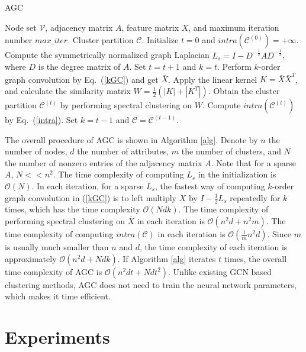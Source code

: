 \documentclass{article}
\begin{document}
\begin{algorithm}[t]\footnotesize
\caption{AGC}
\label{alg}
\begin{algorithmic}[1]
\REQUIRE
Node set $\mathcal{V}$, adjacency matrix $A$, feature matrix $X$, and maximum iteration number $max\_iter$.
\ENSURE
Cluster partition $\mathcal{C}$.
\STATE Initialize $t=0$ and $intra(\mathcal{C}^{(0)})=+\infty$. Compute the symmetrically normalized graph Laplacian $L_s=I-D^{-\frac12}AD^{-\frac12}$, where $D$ is the degree matrix of $A$.
\REPEAT
\STATE Set $t=t+1$ and $k=t$.
\STATE Perform $k$-order graph convolution by Eq.~(\ref{kGC}) and get $\bar{X}$.
\STATE Apply the linear kernel $K=\bar{X}\bar{X}^T$, and calculate the similarity matrix $W=\frac12(|K|+|K^T|)$.
\STATE Obtain the cluster partition $\mathcal{C}^{(t)}$ by performing spectral clustering on $W$.
\STATE Compute $intra(\mathcal{C}^{(t)})$ by Eq.~(\ref{intra}).
\STATE Set $k=t-1$ and $\mathcal{C}=\mathcal{C}^{(t-1)}$.
\end{algorithmic}
\end{algorithm}

The overall procedure of AGC is shown in Algorithm \ref{alg}.
Denote by $n$ the number of nodes, $d$ the number of attributes, $m$ the number of clusters, and $N$ the number of nonzero entries of the adjacency matrix $A$. Note that for a sparse $A$, $N<<n^2$. The time complexity of computing $L_s$ in the initialization is $\mathcal{O}(N)$. In each iteration, for a sparse $L_s$, the fastest way of computing $k$-order graph convolution in (\ref{kGC}) is to left multiply $X$ by $I-\frac12 L_s$ repeatedly for $k$ times, which has the time complexity $\mathcal{O}(Ndk)$. The time complexity of performing spectral clustering on $\bar{X}$ in each iteration is $\mathcal{O}(n^2d+n^2m)$. The time complexity of computing $intra(\mathcal{C})$ in each iteration is $\mathcal{O}(\frac1m n^2d)$. Since $m$ is usually much smaller than $n$ and $d$, the time complexity of each iteration is approximately  $\mathcal{O}(n^2d+Ndk)$. If Algorithm \ref{alg} iterates $t$ times, the overall time complexity of AGC is $\mathcal{O}(n^2dt+Ndt^2)$. Unlike existing GCN based clustering methods, AGC does not need to train the neural network parameters, which makes it time efficient.


 
\section{Experiments}
\end{document}
